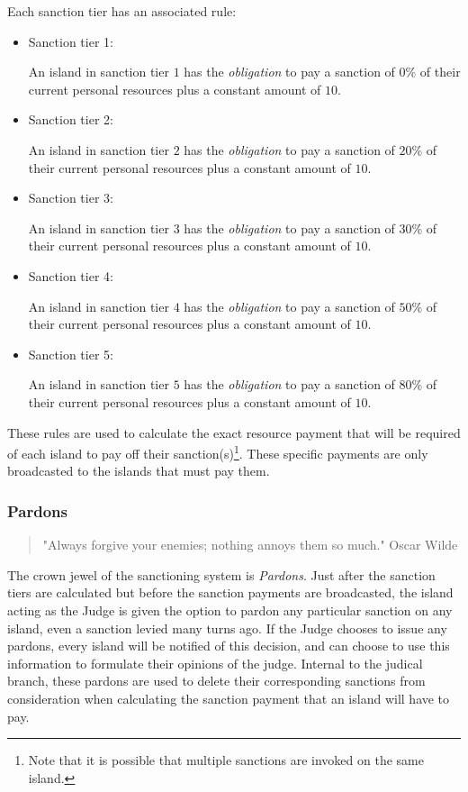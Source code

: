 Each sanction tier has an associated rule:
\begin{itemize}
    \item Sanction tier 1: \begin{rule_IIGO} 
        An island in sanction tier $1$ has the \emph{obligation} to pay a sanction of $0$\% of their current personal resources plus a constant amount of $10$.
    \end{rule_IIGO}
    \item Sanction tier 2: \begin{rule_IIGO} 
        An island in sanction tier $2$ has the \emph{obligation} to pay a sanction of $20$\% of their current personal resources plus a constant amount of $10$.
    \end{rule_IIGO}
    \item Sanction tier 3: \begin{rule_IIGO} 
        An island in sanction tier $3$ has the \emph{obligation} to pay a sanction of $30$\% of their current personal resources plus a constant amount of $10$.
    \end{rule_IIGO}
    \item Sanction tier 4: \begin{rule_IIGO} 
        An island in sanction tier $4$ has the \emph{obligation} to pay a sanction of $50$\% of their current personal resources plus a constant amount of $10$.
    \end{rule_IIGO}
    \item Sanction tier 5: \begin{rule_IIGO} 
        An island in sanction tier $5$ has the \emph{obligation} to pay a sanction of $80$\% of their current personal resources plus a constant amount of $10$.
    \end{rule_IIGO}
\end{itemize}

These rules are used to calculate the exact resource payment that will be required of each island to pay off their sanction(s)\footnote{Note that it is possible that multiple sanctions are invoked on the same island.}. These specific payments are only broadcasted to the islands that must pay them.

\subsubsection{Pardons}
\begin{quote}
    "Always forgive your enemies; nothing annoys them so much."
    \noindent Oscar Wilde
\end{quote}
The crown jewel of the sanctioning system is \emph{Pardons}. Just after the sanction tiers are calculated but before the sanction payments are broadcasted, the island acting as the Judge is given the option to pardon any particular sanction on any island, even a sanction levied many turns ago. 
If the Judge chooses to issue any pardons, every island will be notified of this decision, and can choose to use this information to formulate their opinions of the judge. 
Internal to the judical branch, these pardons are used to delete their corresponding sanctions from consideration when calculating the sanction payment that an island will have to pay.
